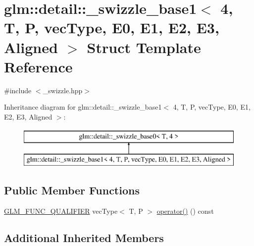 \hypertarget{structglm_1_1detail_1_1__swizzle__base1_3_014_00_01_t_00_01_p_00_01vec_type_00_01_e0_00_01_e1_0074d83cdf10610a072bf3157b31203824}{}\section{glm\+::detail\+::\+\_\+swizzle\+\_\+base1$<$ 4, T, P, vec\+Type, E0, E1, E2, E3, Aligned $>$ Struct Template Reference}
\label{structglm_1_1detail_1_1__swizzle__base1_3_014_00_01_t_00_01_p_00_01vec_type_00_01_e0_00_01_e1_0074d83cdf10610a072bf3157b31203824}


{\ttfamily \#include $<$\+\_\+swizzle.\+hpp$>$}

Inheritance diagram for glm\+::detail\+::\+\_\+swizzle\+\_\+base1$<$ 4, T, P, vec\+Type, E0, E1, E2, E3, Aligned $>$\+:\begin{figure}[H]
\begin{center}
\leavevmode
\includegraphics[height=2.000000cm]{structglm_1_1detail_1_1__swizzle__base1_3_014_00_01_t_00_01_p_00_01vec_type_00_01_e0_00_01_e1_0074d83cdf10610a072bf3157b31203824}
\end{center}
\end{figure}
\subsection*{Public Member Functions}
\begin{DoxyCompactItemize}
\item 
\mbox{\hyperlink{setup_8hpp_a33fdea6f91c5f834105f7415e2a64407}{G\+L\+M\+\_\+\+F\+U\+N\+C\+\_\+\+Q\+U\+A\+L\+I\+F\+I\+ER}} vec\+Type$<$ T, P $>$ \mbox{\hyperlink{structglm_1_1detail_1_1__swizzle__base1_3_014_00_01_t_00_01_p_00_01vec_type_00_01_e0_00_01_e1_0074d83cdf10610a072bf3157b31203824_a497e2bc364ab338474943fc655f69f1e}{operator()}} () const
\end{DoxyCompactItemize}
\subsection*{Additional Inherited Members}


